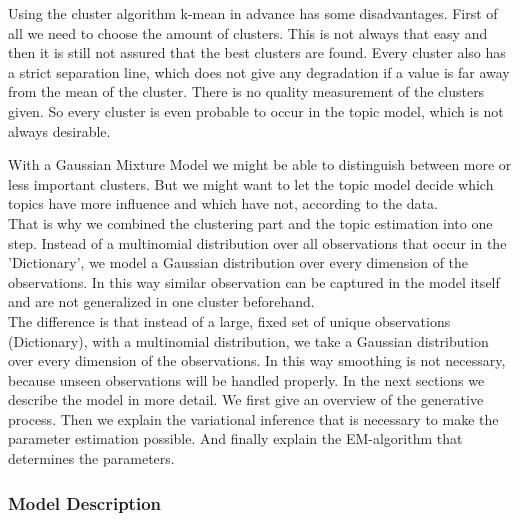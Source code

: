 \documentclass[11pt,a4paper]{article}
\begin{document}
Using the cluster algorithm k-mean in advance has some disadvantages. First of all we need to choose the amount of clusters. This is not always that easy and then it is still not assured that the best clusters are found. Every cluster also has a strict separation line, which does not give any degradation if a value is far away from the mean of the cluster. There is no quality measurement of the clusters given. So every cluster is even probable to occur in the topic model, which is not always desirable.

With a Gaussian Mixture Model we might be able to distinguish between more or less important clusters. But we might want to let the topic model decide which topics have more influence and which have not, according to the data.\\
That is why we combined the clustering part and the topic estimation into one step. Instead of a multinomial distribution over all observations that occur in the 'Dictionary', we model a Gaussian distribution over every dimension of the observations. In this way similar observation can be captured in the model itself and are not generalized in one cluster beforehand.\\
The difference is that instead of a large, fixed set of unique observations (Dictionary), with a multinomial distribution, we take a Gaussian distribution over every dimension of the observations. In this way smoothing is not necessary, because unseen observations will be handled properly.
In the next sections we describe the model in more detail. We first give an overview of the generative process. Then we explain the variational inference that is necessary to make the parameter estimation possible. And finally explain the EM-algorithm that determines the parameters.


  \subsubsection{Model Description}
  
\end{document}
